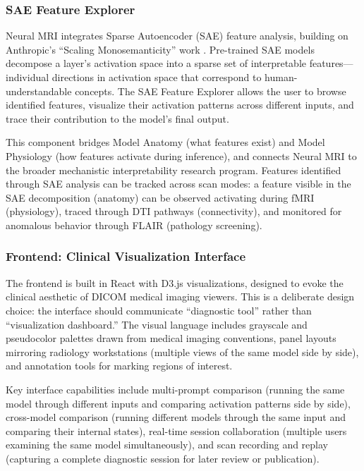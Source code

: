\documentclass[11pt]{article}
\begin{document}
\subsubsection{SAE Feature Explorer}

Neural MRI integrates Sparse Autoencoder (SAE) feature analysis, building on Anthropic's ``Scaling Monosemanticity'' work \citep{Templeton2024}. Pre-trained SAE models decompose a layer's activation space into a sparse set of interpretable features---individual directions in activation space that correspond to human-understandable concepts. The SAE Feature Explorer allows the user to browse identified features, visualize their activation patterns across different inputs, and trace their contribution to the model's final output.

This component bridges Model Anatomy (what features exist) and Model Physiology (how features activate during inference), and connects Neural MRI to the broader mechanistic interpretability research program. Features identified through SAE analysis can be tracked across scan modes: a feature visible in the SAE decomposition (anatomy) can be observed activating during fMRI (physiology), traced through DTI pathways (connectivity), and monitored for anomalous behavior through FLAIR (pathology screening).

\subsubsection{Frontend: Clinical Visualization Interface}

The frontend is built in React with D3.js visualizations, designed to evoke the clinical aesthetic of DICOM medical imaging viewers. This is a deliberate design choice: the interface should communicate ``diagnostic tool'' rather than ``visualization dashboard.'' The visual language includes grayscale and pseudocolor palettes drawn from medical imaging conventions, panel layouts mirroring radiology workstations (multiple views of the same model side by side), and annotation tools for marking regions of interest.

Key interface capabilities include multi-prompt comparison (running the same model through different inputs and comparing activation patterns side by side), cross-model comparison (running different models through the same input and comparing their internal states), real-time session collaboration (multiple users examining the same model simultaneously), and scan recording and replay (capturing a complete diagnostic session for later review or publication).
\end{document}
